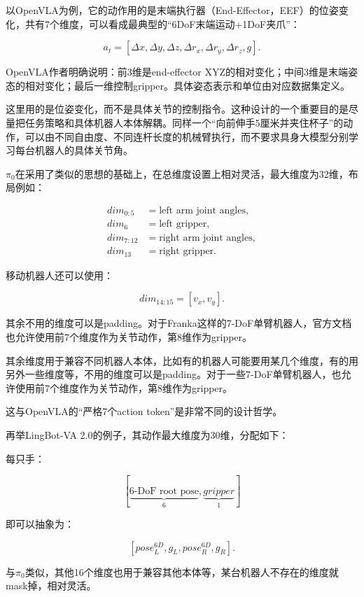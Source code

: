 以OpenVLA为例，它的动作用的是末端执行器（End-Effector，EEF）的位姿变化，共有7个维度，可以看成最典型的``6DoF末端运动+1DoF夹爪''：

\[
a_t=[\Delta x,\Delta y,\Delta z,\Delta r_x,\Delta r_y,\Delta r_z,g].
\]

OpenVLA作者明确说明：前3维是end-effector XYZ的相对变化；中间3维是末端姿态的相对变化；最后一维控制gripper。具体姿态表示和单位由对应数据集定义。

这里用的是位姿变化，而不是具体关节的控制指令。这种设计的一个重要目的是尽量把任务策略和具体机器人本体解耦。同样一个``向前伸手5厘米并夹住杯子''的动作，可以由不同自由度、不同连杆长度的机械臂执行，而不要求具身大模型分别学习每台机器人的具体关节角。

\(\pi_0\)在采用了类似的思想的基础上，在总维度设置上相对灵活，最大维度为32维，布局例如：

\[
\begin{aligned}
\mathit{dim}_{0:5} &= \text{left arm joint angles},\\
\mathit{dim}_{6} &= \text{left gripper},\\
\mathit{dim}_{7:12} &= \text{right arm joint angles},\\
\mathit{dim}_{13} &= \text{right gripper}.
\end{aligned}
\]

移动机器人还可以使用：

\[
\mathit{dim}_{14:15}=[v_x,v_y].
\]

其余不用的维度可以是padding。对于Franka这样的7-DoF单臂机器人，官方文档也允许使用前7个维度作为关节动作，第8维作为gripper。

其余维度用于兼容不同机器人本体，比如有的机器人可能要用某几个维度，有的用另外一些维度等，不用的维度可以是padding。对于一些7-DoF单臂机器人，也允许使用前7个维度作为关节动作，第8维作为gripper。

这与OpenVLA的``严格7个action token''是非常不同的设计哲学。

再举LingBot-VA 2.0的例子，其动作最大维度为30维，分配如下：

每只手：

\[
[\underbrace{\text{6-DoF root pose}}_{6},\underbrace{\mathit{gripper}}_{1}]
\]

即可以抽象为：

\[
[\mathit{pose}^{6D}_L,g_L,\mathit{pose}^{6D}_R,g_R].
\]

与\(\pi_0\)类似，其他16个维度也用于兼容其他本体等，某台机器人不存在的维度就mask掉，相对灵活。

